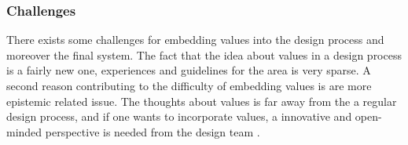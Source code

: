 
\subsubsection{Challenges}
There exists some challenges for embedding values into the design process and moreover the final system. The fact that the idea about values in a design process is a fairly new one, experiences and guidelines for the area is very sparse. A second reason  contributing to the difficulty of embedding values is are more epistemic related issue. The thoughts about values is far away from the a regular design process, and if one wants to incorporate values, a innovative and open-minded perspective is needed from the design team \citep[p. 323]{EmbodyingValues}.



